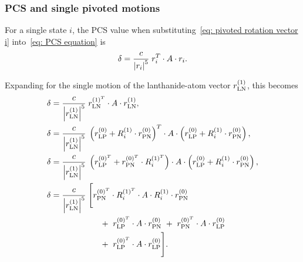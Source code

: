 
\subsubsection{PCS and single pivoted motions}

For a single state $i$, the PCS value when substituting~\ref{eq: pivoted rotation vector i} into~\ref{eq: PCS equation} is
\begin{equation}
    \delta = \frac{c}{\left| r_i \right|^5} \; r_i^T \cdot A \cdot r_i . \label{eq: PCS single pivot} \\
\end{equation}

Expanding for the single motion of the lanthanide-atom vector $r_{\textrm{LN}}^{(1)}$, this becomes
\begin{subequations}
\begin{align}
    \delta &= \frac{c}{\left| r_{\textrm{LN}}^{(1)} \right|^5} \;
                    r_{\textrm{LN}}^{(1)^T} \cdot A \cdot r_{\textrm{LN}}^{(1)} , \\
    \delta &= \frac{c}{\left| r_{\textrm{LN}}^{(1)} \right|^5} \;
                    \left( r_{\textrm{LP}}^{(0)} + R_i^{(1)} \cdot r_{\textrm{PN}}^{(0)} \right)^T
                    \cdot A \cdot
                    \left( r_{\textrm{LP}}^{(0)} + R_i^{(1)} \cdot r_{\textrm{PN}}^{(0)} \right) , \\
    \delta &= \frac{c}{\left| r_{\textrm{LN}}^{(1)} \right|^5} \;
                    \left( r_{\textrm{LP}}^{(0)^T} + r_{\textrm{PN}}^{(0)^T} \cdot R_i^{(1)^T} \right)
                    \cdot A \cdot
                    \left( r_{\textrm{LP}}^{(0)} + R_i^{(1)} \cdot r_{\textrm{PN}}^{(0)} \right) , \\
    \delta &= \frac{c}{\left| r_{\textrm{LN}}^{(1)} \right|^5} \; \Bigg[
                    r_{\textrm{PN}}^{(0)^T} \cdot R_i^{(1)^T} \cdot A \cdot R_i^{(1)} \cdot r_{\textrm{PN}}^{(0)} \nonumber \\
           & \qquad\qquad\qquad  + \ r_{\textrm{LP}}^{(0)^T} \cdot A \cdot r_{\textrm{PN}}^{(0)}
                    \ + \ r_{\textrm{PN}}^{(0)^T} \cdot A \cdot r_{\textrm{LP}}^{(0)} \nonumber \\
           & \qquad\qquad\qquad  + \ r_{\textrm{LP}}^{(0)^T} \cdot A \cdot r_{\textrm{LP}}^{(0)} \Bigg] .
\end{align}
\end{subequations}

